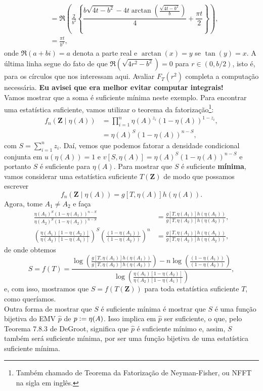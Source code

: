 \documentclass[a4paper,10pt, notitlepage]{report}
\newcommand{\defeq}{\vcentcolon =}
\begin{document}
{\begin{align*}
 &= \Re \left(\frac{2}{b^2} \left\{ \dfrac{b\sqrt{4t-b^2}-4t\arctan\left(\frac{\sqrt{4t-b^2}}{b}\right)}{4}+\dfrac{{\pi}t}{2} \right\} \right),\\
 &= \frac{\pi t}{b^2},
\end{align*}
onde $\Re(a + bi)= a$ denota a parte real e $\arctan(x) = y$ se $\tan(y) = x$.
A última linha segue do fato de que $\Re(\sqrt{4r^2-b^2}) = 0$ para $r \in (0, b/2)$, isto é, para os círculos que nos interessam aqui.
Avaliar $F_T(r^2)$ completa a computação necessária.
\textbf{Eu avisei que era melhor evitar computar integrais!}
\\
Vamos mostrar que a soma é suficiente mínima neste exemplo.
Para encontrar uma estatística suficiente, vamos utilizar o teorema da fatorização\footnote{Também chamado de Teorema da Fatorização de Neyman-Fisher, ou NFFT na sigla em inglês.}:
\begin{align*}
f_n\left(\boldsymbol{Z} \mid \eta(A)\right) &= \prod_{i=1}^n \eta(A)^{z_i} \left(1-\eta(A)\right)^{1-z_i},\\
&= \eta(A)^S \left(1-\eta(A)\right)^{n-S},
\end{align*}
com $S = \sum_{i=1}^n z_i$.
Daí, vemos que podemos fatorar a densidade condicional conjunta em $u(\eta(A)) = 1 $ e $v[S, \eta(A)] = \eta(A)^S \left(1-\eta(A)\right)^{n-S}$  e portanto $S$ é suficiente para $\eta(A)$.
Para mostrar que $S$ é suficiente \textbf{mínima}, vamos considerar uma estatística suficiente $T(\boldsymbol{Z})$ de modo que possamos escrever
$$
f_n\left(\boldsymbol{Z} \mid \eta(A)\right) = g[T, \eta(A)]h(\eta(A)).
$$
Agora, tome $A_1 \neq A_2$ e faça
\begin{align*}
\frac{ \eta(A_1)^S \left(1-\eta(A_1)\right)^{n-S}}{ \eta(A_2)^S \left(1-\eta(A_2)\right)^{n-S}} &= \frac{g[T, \eta(A_1)]h(\eta(A_1))}{g[T, \eta(A_2)]h(\eta(A_2))},\\
\left(\frac{\eta(A_1)\left[1-\eta(A_2)\right]}{\eta(A_2)\left[1-\eta(A_1)\right]}\right)^S\left(\frac{\left(1-\eta(A_1)\right)}{\left(1-\eta(A_2)\right)}\right)^n &= \frac{g[T, \eta(A_1)]h(\eta(A_1))}{g[T, \eta(A_2)]h(\eta(A_2))},
\end{align*}
de onde obtemos
$$
S = f(T) =\frac{\log \left( \frac{g[T, \eta(A_1)]h(\eta(A_1))}{g[T, \eta(A_2)]h(\eta(A_2))}\right) - n\log \left(\frac{\left(1-\eta(A_1)\right)}{\left(1-\eta(A_2)\right)}\right)}{\log \left(\frac{\eta(A_1)\left[1-\eta(A_2)\right]}{\eta(A_2)\left[1-\eta(A_1)\right]}\right) },
$$
e, com isso, mostramos que $S = f(T(\boldsymbol{Z}))$ para toda estatística suficiente $T$, como queríamos.
\\
Outra forma de mostrar que \( S \) é suficiente mínima é mostrar que \( S \) é uma função bijetiva do EMV \( \hat{ p } \) de \( p \defeq \eta ( A ) \).
Isso implica em \( \hat{ p } \) ser suficiente, o que, pelo Teorema 7.8.3 de DeGroot, significa que \( \hat{ p } \) é suficiente mínimo e, assim, \( S \) também será suficiente mínima, por ser uma função bijetiva de uma estatística suficiente mínima.

}
\end{document}
